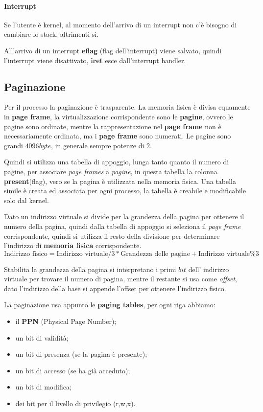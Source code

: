 \paragraph{Interrupt}
Se l'utente è kernel, al momento dell'arrivo di un interrupt non c'è bisogno
di cambiare lo stack, altrimenti sì.

All'arrivo di un interrupt \textbf{eflag} (flag dell'interrupt) viene salvato,
quindi l'interrupt viene disattivato, \textbf{iret} esce dall'interrupt
handler.


\subsection{Paginazione}
Per il processo la paginazione è trasparente.
La memoria fisica è divisa equamente in \textbf{page frame}, la
virtualizzazione corrispondente sono le \textbf{pagine}, ovvero le pagine sono
ordinate, mentre la rappresentazione nel \textbf{page frame} non è
necessariamente ordinata, ma i \textbf{page frame} sono numerati.
Le pagine sono grandi $4096byte$, in generale sempre potenze di $2$.


Quindi si utilizza una tabella di appoggio, lunga tanto quanto il numero di
pagine, per associare \emph{page frames} a \emph{pagine}, in questa tabella la
colonna \textbf{present}(flag), vero se la pagina è utilizzata nella memoria
fisica.
Una tabella simile è creata ed associata per ogni processo, la tabella è
creabile e modificabile solo dal kernel.


Dato un indirizzo virtuale si divide per la grandezza della pagina per ottenere
il numero della pagina, quindi dalla tabella di appoggio si seleziona il \emph{
page frame} corrispondente, quindi si utilizza il resto della divisione per
determinare l'indirizzo di \textbf{memoria fisica} corrispondente.
\[
  \text{Indirizzo fisico} = \text{Indirizzo virtuale}/3 * \text{Grandezza delle
  pagine} + \text{Indirizzo virtuale} \% 3 
\]

Stabilita la grandezza della pagina si interpretano i primi $bit$ dell' 
indirizzo virtuale per trovare il numero di pagina, mentre il restante si usa
come \emph{offset}, dato l'indirizzo della base si appende l'offset per
ottenere l'indirizzo fisico.


La paginazione usa appunto le \textbf{paging tables}, per ogni riga abbiamo:
\begin{itemize}
  \item il \textbf{PPN} (Physical Page Number);
  \item un bit di validità;
  \item un bit di presenza (se la pagina è presente);
  \item un bit di accesso (se ha già acceduto);
  \item un bit di modifica;
  \item dei bit per il livello di privilegio (r,w,x).
\end{itemize}


